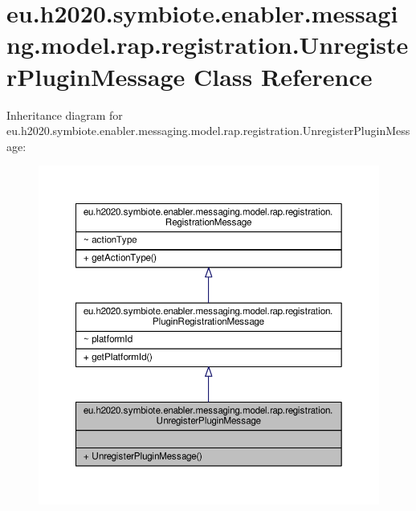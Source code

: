 \hypertarget{classeu_1_1h2020_1_1symbiote_1_1enabler_1_1messaging_1_1model_1_1rap_1_1registration_1_1UnregisterPluginMessage}{}\section{eu.\+h2020.\+symbiote.\+enabler.\+messaging.\+model.\+rap.\+registration.\+Unregister\+Plugin\+Message Class Reference}
\label{classeu_1_1h2020_1_1symbiote_1_1enabler_1_1messaging_1_1model_1_1rap_1_1registration_1_1UnregisterPluginMessage}


Inheritance diagram for eu.\+h2020.\+symbiote.\+enabler.\+messaging.\+model.\+rap.\+registration.\+Unregister\+Plugin\+Message\+:
\nopagebreak
\begin{figure}[H]
\begin{center}
\leavevmode
\includegraphics[width=350pt]{classeu_1_1h2020_1_1symbiote_1_1enabler_1_1messaging_1_1model_1_1rap_1_1registration_1_1UnregisterPluginMessage__inherit__graph}
\end{center}
\end{figure}


